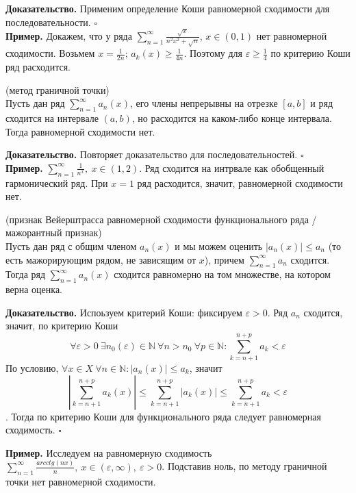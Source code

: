\textbf{Доказательство.} Применим определение Коши равномерной сходимости для
последовательности. $\square$ \\
\textbf{Пример.} Докажем, что у ряда $\sum\limits_{n=1}^{\infty} \frac{\sqrt{
x} }{n^2x^2+\sqrt{n} }$, $x\in(0,1)$ нет равномерной сходимости. Возьмем 
$x=\frac{1}{2n}$; $a_k(x)\geqslant \frac{1}{4n}$. Поэтому для $\varepsilon
\geqslant \frac{1}{4}$ по критерию Коши ряд расходится.
\begin{theor}
    (метод граничной точки)\\
    Пусть дан ряд $\sum\limits_{n=1}^{\infty} a_n(x)$, его члены непрерывны
    на отрезке $[a,b]$ и ряд сходится на интервале  $(a,b)$, но расходится
    на каком-либо конце интервала. Тогда равномерной сходимости нет. 
\end{theor}
\textbf{Доказательство.}  Повторяет доказательство для последовательностей.
$\square$ \\ 
\textbf{Пример.} $\sum\limits_{n=1}^{\infty} \frac{1}{n^x},~x\in(1,2)$. Ряд
сходится на интрвале как обобщенный гармонический ряд. При $x=1$ ряд 
расходится, значит, равномерной сходимости нет.
 \begin{theor}
     (признак Вейерштрасса равномерной сходимости функционального ряда
     /мажорантный признак)\\
     Пусть дан ряд с общим членом $a_n(x)$ и мы можем оценить 
    $|a_n(x)|\leqslant  a_n$ (то есть мажорирующим рядом, не зависящим от $x$),
причем $\sum\limits_{n=1}^{\infty}a_n$ сходится.
Тогда ряд $\sum\limits_{n=1}^{\infty} a_n(x)$ сходится равномерно на том
множестве, на котором верна оценка. 
\end{theor}
\textbf{Доказательство.}  Испоьзуем критерий Коши: фиксируем 
$\varepsilon>0$. Ряд $a_n$ сходится, значит, по критерию Коши
$$\forall \varepsilon>0~\exists n_0(\varepsilon)\in\mathbb{N}~\forall n>n_0~
 \forall p\in\mathbb{N}: \sum\limits_{k=n+1}^{n+p} a_k<\varepsilon$$
По условию, $\forall x\in X~\forall n\in\mathbb{N}: |a_n(x)|\leqslant a_k$,
значит 
$$\left|\sum\limits_{k=n+1}^{n+p} a_k(x)\right|\leqslant 
\sum\limits_{k=n+1}^{n+p}|a_k(x)|\leqslant \sum\limits_{k=n+1}^{n+p}
a_k<\varepsilon$$. Тогда 
по критерию Коши для функционального ряда следует равномерная сходимость.
$\square$ 

\textbf{Пример.} Исследуем на равномерную сходимость $\sum\limits_{n=1}^
{\infty} \frac{arcctg(nx)}{n},~x\in(\varepsilon,\infty),~\varepsilon>0$.
Подставив ноль, по методу граничной точки нет равномерной сходимости.

